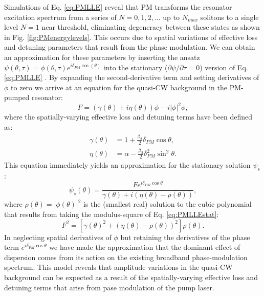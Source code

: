 Simulations of Eq. \ref{eq:PMLLE} reveal that PM transforms the resonator excitation spectrum from a series of $N=0, 1, 2,...$ up to $N_{max}$ solitons to a single level $N=1$ near threshold, eliminating degeneracy between these states as shown in Fig. \ref{fig:PMenergylevels}. This occurs due to spatial variations of effective loss and detuning parameters that result from the phase modulation. We can obtain an approximation for these parameters by inserting the ansatz $\psi(\theta,\tau)=\phi(\theta,\tau)e^{i\delta_{PM}\cos(\theta)}$ into the stationary ($\partial \psi/\partial \tau=0$) version of Eq. \ref{eq:PMLLE} \cite{Jang2015a}.  By expanding the second-derivative term and setting derivatives of $\phi$ to zero we arrive at an equation for the quasi-CW background in the PM-pumped resonator:
\begin{equation}
F=\left(\gamma(\theta)+i\eta(\theta)\right)\phi-i|\phi|^2\phi, \label{eq:PMLLEstat}
\end{equation}
where the spatially-varying effective loss and detuning terms have been defined as:
\begin{align}
\gamma(\theta)&=1+\frac{\beta_2}{2}\delta_{PM}\cos{\theta},\\
\eta(\theta)&=\alpha-\frac{\beta_2}{2}\delta_{PM}^2\sin^2{\theta}.
\end{align}
This equation immediately yields an approximation for the stationary solution $\psi_s$:
\begin{equation}
\psi_s(\theta)=\frac{Fe^{i\delta_{PM}\cos{\theta}}}{\gamma(\theta)+i\left(\eta(\theta)-\rho(\theta)\right)},\label{eq:PMLLEstatpsi}
\end{equation}
where $\rho(\theta)=|\phi(\theta)|^2$ is the (smallest real) solution to the cubic polynomial that results from taking the modulus-square of Eq. \ref{eq:PMLLEstat}:
\begin{equation}
F^2=\left[\gamma(\theta)^2+\left(\eta(\theta)-\rho(\theta)\right)^2\right]\rho(\theta). \label{eq:PMLLEstat2}
\end{equation}
In neglecting spatial derivatives of $\phi$ but retaining the derivatives of the phase term $e^{i\delta_{PM}\cos{\theta}}$ we have made the approximation that the dominant effect of dispersion comes from its action on the existing broadband phase-modulation spectrum. This model reveals that amplitude variations in the quasi-CW background can be expected as a result of the spatially-varying effective loss and detuning terms that arise from pase modulation of the pump laser.

